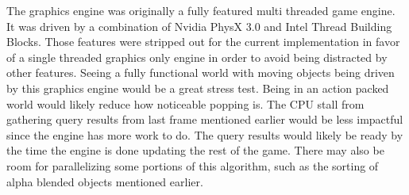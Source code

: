\documentclass[12pt]{ucthesis}
\begin{document}
The graphics engine was originally a fully featured multi threaded game engine.
It was driven by a combination of Nvidia PhysX 3.0 and Intel Thread Building Blocks.
Those features were stripped out for the current implementation in favor of a single threaded graphics only engine in order to avoid being distracted by other features.
Seeing a fully functional world with moving objects being driven by this graphics engine would be a great stress test.
Being in an action packed world would likely reduce how noticeable popping is.
The CPU stall from gathering query results from last frame mentioned earlier would be less impactful since the engine has more work to do.
The query results would likely be ready by the time the engine is done updating the rest of the game.
There may also be room for parallelizing some portions of this algorithm, such as the sorting of alpha blended objects mentioned earlier.


\clearpage


\end{document}
